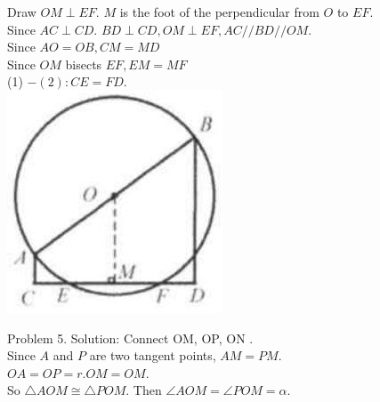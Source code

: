 \documentclass[10pt]{article}
\begin{document}
Draw \(O M \perp E F\). \(M\) is the foot of the perpendicular from \(O\) to \(E F\).\\
Since \(A C \perp C D\). \(B D \perp C D, O M \perp E F, A C / / B D / / O M\).\\
Since \(A O=O B, C M=M D\)\\
Since \(O M\) bisects \(E F, E M=M F\)\\
(1) \(-(2): C E=F D\).\\
\includegraphics[max width=\textwidth, center]{2025_04_17_97bc1f7e44d93c271a88g-158}

Problem 5. Solution:
Connect OM, OP, ON .\\
Since \(A\) and \(P\) are two tangent points, \(A M=P M\).\\
\(O A=O P=r . O M=O M\).\\
So \(\triangle A O M \cong \triangle P O M\). Then \(\angle A O M=\angle P O M=\alpha\).
\end{document}
